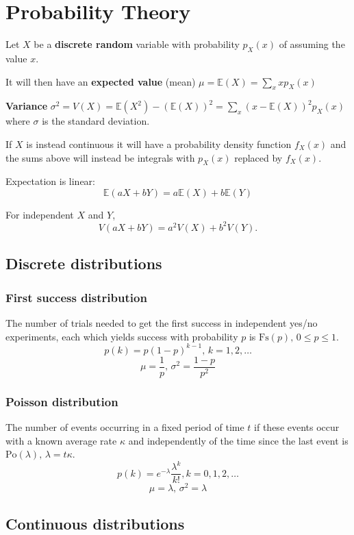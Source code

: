 \section{Probability Theory}


Let $X$ be a \textbf{discrete random} variable with probability $p_X(x)$ of assuming the value $x$.

It will then have an \textbf{expected value} (mean) $\mu=\mathbb{E}(X)=\sum_xxp_X(x)$

\textbf{Variance} $\sigma^2=V(X)=\mathbb{E}(X^2)-(\mathbb{E}(X))^2=\sum_x(x-\mathbb{E}(X))^2p_X(x)$ where $\sigma$ is the standard deviation. 

If $X$ is instead continuous it will have a probability density function $f_X(x)$ and the sums above will instead be integrals with $p_X(x)$ replaced by $f_X(x)$.

Expectation is linear:
\[\mathbb{E}(aX+bY) = a\mathbb{E}(X)+b\mathbb{E}(Y)\]

For independent $X$ and $Y$, \[V(aX+bY) = a^2V(X)+b^2V(Y).\]

\subsection{Discrete distributions}

\subsubsection{First success distribution}
The number of trials needed to get the first success in independent yes/no experiments, each which yields success with probability $p$ is $\textrm{Fs}(p),\,0\leq p\leq1$.
\[p(k)=p(1-p)^{k-1},\,k=1,2,\dots\]
\[\mu = \frac1p,\,\sigma^2=\frac{1-p}{p^2}\]

\subsubsection{Poisson distribution}
The number of events occurring in a fixed period of time $t$ if these events occur with a known average rate $\kappa$ and independently of the time since the last event is $\textrm{Po}(\lambda),\,\lambda=t\kappa$.
\[p(k)=e^{-\lambda}\frac{\lambda^k}{k!}, k=0,1,2,\dots\]
\[\mu=\lambda,\,\sigma^2=\lambda\]

\subsection{Continuous distributions}

